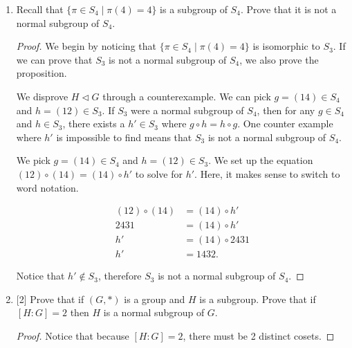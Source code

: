 \documentclass{article}
\newcommand{\normsub}{\lhd}
\begin{document}
\begin{enumerate}
{\begin{enumerate}
            \item {
                Recall that \(\{\pi \in S_4 \mid \pi(4) = 4\}\) is a subgroup of \(S_4\). Prove that it is not a normal subgroup of \(S_4\).
    
                \begin{proof}
                    We begin by noticing that \(\{\pi \in S_4 \mid \pi(4) = 4\}\)
                    is isomorphic to \(S_3\). If we can prove that \(S_3\) is not 
                    a normal subgroup of \(S_4\), we also prove the proposition.

                    We disprove \(H \normsub G\)  
                    through a counterexample. We can pick \(g = (14) \in S_4\) and 
                    \(h = (12) \in S_3\). If \(S_3\) were a normal subgroup of
                    \(S_4\), then for any \(g \in S_4\) and \(h \in S_3\), 
                    there exists a \(h' \in S_3\) where \(g \circ h = h \circ g\).
                    One counter example where \(h'\) is impossible to find means 
                    that \(S_3\) is not a normal subgroup of \(S_4\).

                    We pick \(g = (14) \in S_4\) and \(h = (12) \in S_3\).
                    We set up the equation \((12) \circ (14) = (14) \circ h'\) to 
                    solve for \(h'\). Here, it makes sense to switch to word 
                    notation.

                    \begin{align}
                        (12) \circ (14) &= (14) \circ h' \\
                        2431 &= (14) \circ h' \\
                        h' &= (14) \circ 2431 \\
                        h' &= 1432.
                    \end{align}

                    Notice that \(h' \not \in S_3\), therefore \(S_3\) is not a 
                    normal subgroup of \(S_4\).
                \end{proof}
            }

            \item {
                [2] Prove that if \((G,*)\) is a group and \(H\) is a subgroup.
                Prove that if \({[H : G] = 2}\) then \(H\) is a normal subgroup of \(G\).

                \begin{proof}
                    Notice that because \({[H : G] = 2}\), there must be 2 distinct 
                    cosets. 
                    

\end{proof}}
\end{enumerate}}
\end{enumerate}
\end{document}
